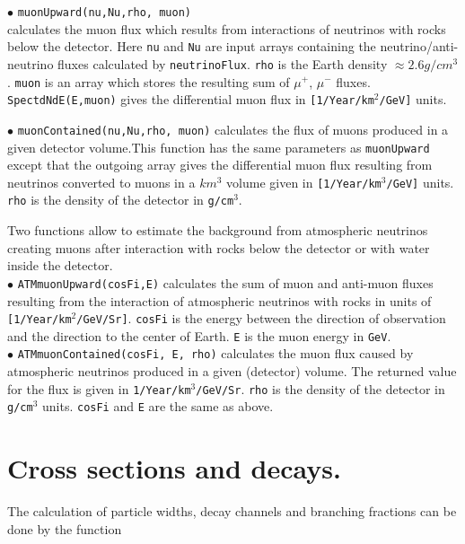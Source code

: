 \documentclass[12pt,a4paper]{article}
\begin{document}
\noindent
$\bullet$ \verb|muonUpward(nu,Nu,rho, muon)|\\
calculates the muon flux which results from interactions of
neutrinos with rocks below the detector. Here  {\tt nu} and {\tt Nu} are input arrays containing the
neutrino/anti-neutrino fluxes calculated by {\tt neutrinoFlux}. 
{\tt rho} is  the Earth density $\approx 2.6g/cm^3$. {\tt muon} is an
array which stores the resulting sum of $\mu^+$, $\mu^-$ fluxes. {\tt SpectdNdE(E,muon)}  gives the
differential muon flux  in \verb|[1/Year/km|$^2$\verb|/GeV]| units.  
 

\noindent $\bullet$ \verb|muonContained(nu,Nu,rho, muon)|
calculates  the flux  of muons  produced in a given detector volume.This function  has the same parameters as \verb|muonUpward| 
except that the  outgoing  array gives the differential muon flux resulting from neutrinos converted to muons 
in a  $km^3$ volume given  in \verb|[1/Year/km|$^3$\verb|/GeV]| units.  \verb|rho| is the density of the detector in 
\verb|g/cm|$^3$.


Two functions allow to estimate the background from atmospheric neutrinos creating muons after interaction  with rocks below the detector  or with water inside the detector.\\
\noindent $\bullet$  \verb|ATMmuonUpward(cosFi,E)| calculates the sum of  muon
and anti-muon fluxes resulting from the
interaction of  atmospheric  neutrinos with rocks in units of  
\verb|[1/Year/km|$^2$\verb|/GeV/Sr]|. \verb|cosFi|  is the energy between the direction of
observation and the direction to the center of Earth. \verb|E|  is the  muon energy in
{\tt GeV}.\\
\noindent $\bullet$  \verb|ATMmuonContained(cosFi, E, rho)| calculates the muon flux
caused by atmospheric  neutrinos  produced in a given (detector)
volume. The returned value for the flux is given in
\verb|1/Year/km|$^3$\verb|/GeV/Sr|. {\tt rho} is
the density of the detector in \verb|g/cm|$^3$ units. {\tt cosFi} and {\tt E} are the
same as above. 



\section{Cross sections and decays.}
\label{cross_section}

The calculation of particle widths, decay channels  and branching fractions
can be done by the function\\
\end{document}
